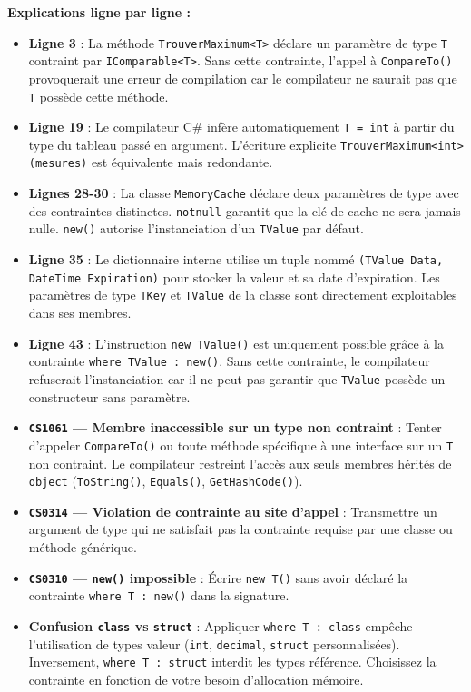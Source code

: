 \textbf{Explications ligne par ligne :}
\begin{itemize}
    \item \textbf{Ligne 3} : La méthode \texttt{TrouverMaximum<T>} déclare un paramètre de type \texttt{T} contraint par \texttt{IComparable<T>}. Sans cette contrainte, l'appel à \texttt{CompareTo()} provoquerait une erreur de compilation car le compilateur ne saurait pas que \texttt{T} possède cette méthode.
    \item \textbf{Ligne 19} : Le compilateur C\# infère automatiquement \texttt{T = int} à partir du type du tableau passé en argument. L'écriture explicite \texttt{TrouverMaximum<int>(mesures)} est équivalente mais redondante.
    \item \textbf{Lignes 28-30} : La classe \texttt{MemoryCache} déclare deux paramètres de type avec des contraintes distinctes. \texttt{notnull} garantit que la clé de cache ne sera jamais nulle. \texttt{new()} autorise l'instanciation d'un \texttt{TValue} par défaut.
    \item \textbf{Ligne 35} : Le dictionnaire interne utilise un tuple nommé \texttt{(TValue Data, DateTime Expiration)} pour stocker la valeur et sa date d'expiration. Les paramètres de type \texttt{TKey} et \texttt{TValue} de la classe sont directement exploitables dans ses membres.
    \item \textbf{Ligne 43} : L'instruction \texttt{new TValue()} est uniquement possible grâce à la contrainte \texttt{where TValue : new()}. Sans cette contrainte, le compilateur refuserait l'instanciation car il ne peut pas garantir que \texttt{TValue} possède un constructeur sans paramètre.
\end{itemize}

\begin{tcolorbox}[colback=white,colframe=keywordcolor,title=\textbf{Pièges courants \& Erreurs de compilation}]
    \begin{itemize}
        \item \textbf{\texttt{CS1061} — Membre inaccessible sur un type non contraint} : Tenter d'appeler \texttt{CompareTo()} ou toute méthode spécifique à une interface sur un \texttt{T} non contraint. Le compilateur restreint l'accès aux seuls membres hérités de \texttt{object} (\texttt{ToString()}, \texttt{Equals()}, \texttt{GetHashCode()}).
        \item \textbf{\texttt{CS0314} — Violation de contrainte au site d'appel} : Transmettre un argument de type qui ne satisfait pas la contrainte requise par une classe ou méthode générique.
        \item \textbf{\texttt{CS0310} — \texttt{new()} impossible} : Écrire \texttt{new T()} sans avoir déclaré la contrainte \texttt{where T : new()} dans la signature.
        \item \textbf{Confusion \texttt{class} vs \texttt{struct}} : Appliquer \texttt{where T : class} empêche l'utilisation de types valeur (\texttt{int}, \texttt{decimal}, \texttt{struct} personnalisées). Inversement, \texttt{where T : struct} interdit les types référence. Choisissez la contrainte en fonction de votre besoin d'allocation mémoire.
    \end{itemize}
\end{tcolorbox}

